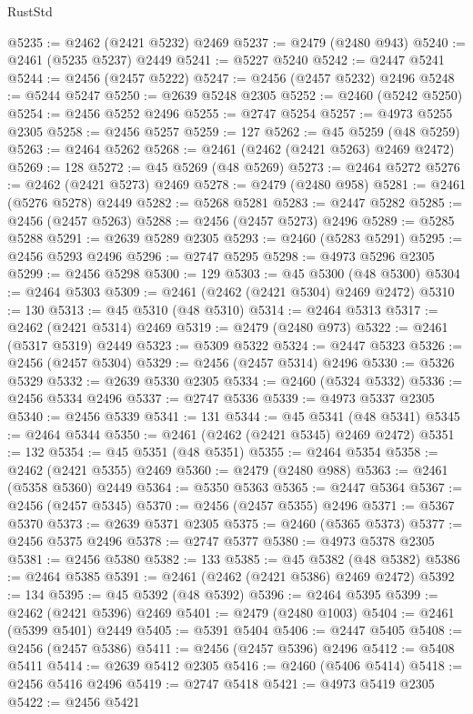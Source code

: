 \begin{lexlean}{RustStd}
\begin{coremodule}
@5235 := @2462 (@2421 @5232) @2469
@5237 := @2479 (@2480 @943)
@5240 := @2461 (@5235 @5237) @2449
@5241 := @5227 @5240
@5242 := @2447 @5241
@5244 := @2456 (@2457 @5222)
@5247 := @2456 (@2457 @5232) @2496
@5248 := @5244 @5247
@5250 := @2639 @5248 @2305
@5252 := @2460 (@5242 @5250)
@5254 := @2456 @5252 @2496
@5255 := @2747 @5254
@5257 := @4973 @5255 @2305
@5258 := @2456 @5257
@5259 := 127
@5262 := @45 @5259 (@48 @5259)
@5263 := @2464 @5262
@5268 := @2461 (@2462 (@2421 @5263) @2469 @2472)
@5269 := 128
@5272 := @45 @5269 (@48 @5269)
@5273 := @2464 @5272
@5276 := @2462 (@2421 @5273) @2469
@5278 := @2479 (@2480 @958)
@5281 := @2461 (@5276 @5278) @2449
@5282 := @5268 @5281
@5283 := @2447 @5282
@5285 := @2456 (@2457 @5263)
@5288 := @2456 (@2457 @5273) @2496
@5289 := @5285 @5288
@5291 := @2639 @5289 @2305
@5293 := @2460 (@5283 @5291)
@5295 := @2456 @5293 @2496
@5296 := @2747 @5295
@5298 := @4973 @5296 @2305
@5299 := @2456 @5298
@5300 := 129
@5303 := @45 @5300 (@48 @5300)
@5304 := @2464 @5303
@5309 := @2461 (@2462 (@2421 @5304) @2469 @2472)
@5310 := 130
@5313 := @45 @5310 (@48 @5310)
@5314 := @2464 @5313
@5317 := @2462 (@2421 @5314) @2469
@5319 := @2479 (@2480 @973)
@5322 := @2461 (@5317 @5319) @2449
@5323 := @5309 @5322
@5324 := @2447 @5323
@5326 := @2456 (@2457 @5304)
@5329 := @2456 (@2457 @5314) @2496
@5330 := @5326 @5329
@5332 := @2639 @5330 @2305
@5334 := @2460 (@5324 @5332)
@5336 := @2456 @5334 @2496
@5337 := @2747 @5336
@5339 := @4973 @5337 @2305
@5340 := @2456 @5339
@5341 := 131
@5344 := @45 @5341 (@48 @5341)
@5345 := @2464 @5344
@5350 := @2461 (@2462 (@2421 @5345) @2469 @2472)
@5351 := 132
@5354 := @45 @5351 (@48 @5351)
@5355 := @2464 @5354
@5358 := @2462 (@2421 @5355) @2469
@5360 := @2479 (@2480 @988)
@5363 := @2461 (@5358 @5360) @2449
@5364 := @5350 @5363
@5365 := @2447 @5364
@5367 := @2456 (@2457 @5345)
@5370 := @2456 (@2457 @5355) @2496
@5371 := @5367 @5370
@5373 := @2639 @5371 @2305
@5375 := @2460 (@5365 @5373)
@5377 := @2456 @5375 @2496
@5378 := @2747 @5377
@5380 := @4973 @5378 @2305
@5381 := @2456 @5380
@5382 := 133
@5385 := @45 @5382 (@48 @5382)
@5386 := @2464 @5385
@5391 := @2461 (@2462 (@2421 @5386) @2469 @2472)
@5392 := 134
@5395 := @45 @5392 (@48 @5392)
@5396 := @2464 @5395
@5399 := @2462 (@2421 @5396) @2469
@5401 := @2479 (@2480 @1003)
@5404 := @2461 (@5399 @5401) @2449
@5405 := @5391 @5404
@5406 := @2447 @5405
@5408 := @2456 (@2457 @5386)
@5411 := @2456 (@2457 @5396) @2496
@5412 := @5408 @5411
@5414 := @2639 @5412 @2305
@5416 := @2460 (@5406 @5414)
@5418 := @2456 @5416 @2496
@5419 := @2747 @5418
@5421 := @4973 @5419 @2305
@5422 := @2456 @5421

\end{coremodule}
\end{lexlean}
